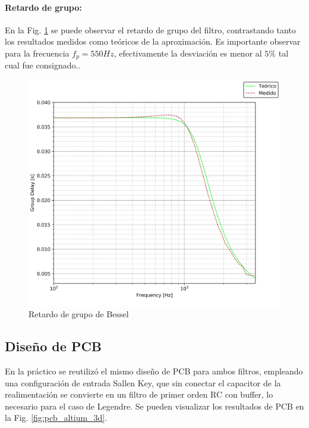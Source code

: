 \paragraph{Retardo de grupo:} En la Fig. \ref{fig:bessel_group_delay} se puede observar el retardo de grupo del filtro, contrastando tanto los resultados medidos como te\'oricos de la aproximaci\'on.
Es importante observar para la frecuencia $f_p = 550Hz$, efectivamente la desviaci\'on es menor al $5\%$ tal cual fue consignado..

\begin{figure}[H]
    \centering
    \includegraphics[scale=0.7]{../EJ1/Recursos/bessel_group_delay.png}
    \caption{Retardo de grupo de Bessel}
    \label{fig:bessel_group_delay}
\end{figure}

\subsection{Dise\~no de PCB}
En la pr\'actico se reutiliz\'o el mismo dise\~no de PCB para ambos filtros, empleando una configuraci\'on de entrada Sallen Key,
que sin conectar el capacitor de la realimentaci\'on se convierte en un filtro de primer orden RC con buffer, lo necesario para el caso
de Legendre. Se pueden visualizar los resultados de PCB en la Fig. \ref{fig:pcb_altium_3d}.

